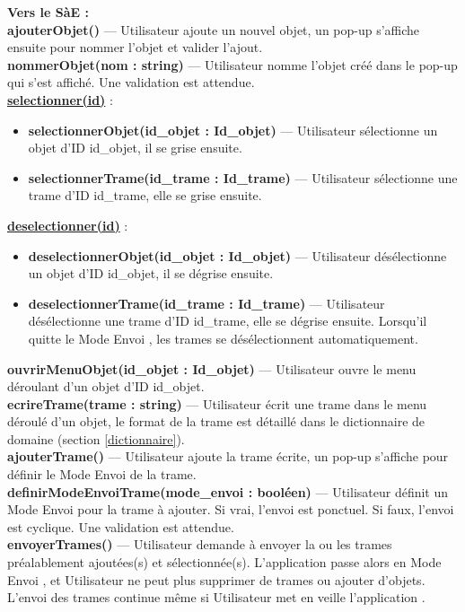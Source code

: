 \textbf{Vers le SàE :} \vspace{0.2cm}\\ %
\textbf{ajouterObjet()} --- Utilisateur ajoute un nouvel objet, un pop-up s'affiche ensuite pour nommer l'objet et valider l'ajout. \\
\textbf{nommerObjet(nom : string) } --- Utilisateur nomme l'objet créé dans le pop-up qui s'est affiché. Une validation est attendue. \\
\textbf{ \underline{selectionner(id)}} : 
\begin{itemize}
    \item \textbf{selectionnerObjet(id\_objet : Id\_objet)} --- Utilisateur sélectionne un objet d'ID id\_objet, il se grise ensuite. 
    \item \textbf{selectionnerTrame(id\_trame : Id\_trame)} --- Utilisateur sélectionne une trame d'ID id\_trame, elle se grise ensuite. 
\end{itemize}
\textbf{ \underline{deselectionner(id)}} : 
\begin{itemize}
    \item \textbf{deselectionnerObjet(id\_objet : Id\_objet)} --- Utilisateur désélectionne un objet d'ID id\_objet, il se dégrise ensuite. 
    \item \textbf{deselectionnerTrame(id\_trame : Id\_trame)} --- Utilisateur désélectionne une trame d'ID id\_trame, elle se dégrise ensuite. Lorsqu'il quitte le {\guillemotleft} Mode Envoi {\guillemotright}, les trames se désélectionnent automatiquement. 
\end{itemize}
\textbf{ouvrirMenuObjet(id\_objet : Id\_objet)} --- Utilisateur ouvre le menu déroulant d'un objet d'ID id\_objet. \\
\textbf{ecrireTrame(trame : string)} --- Utilisateur écrit une trame dans le menu déroulé d'un objet, le format de la trame est détaillé dans le dictionnaire de domaine (section \ref{dictionnaire}). \\
\textbf{ajouterTrame()} --- Utilisateur ajoute la trame écrite, un pop-up s'affiche pour définir le Mode Envoi de la trame.\\
\textbf{definirModeEnvoiTrame(mode\_envoi : booléen)} --- Utilisateur définit un Mode Envoi pour la trame à ajouter. Si vrai, l'envoi est ponctuel. Si faux, l'envoi est cyclique. Une validation est attendue. \\
\textbf{envoyerTrames()} --- Utilisateur demande à envoyer la ou les trames préalablement ajoutées(s) et sélectionnée(s). L'application {\nomApplication} passe alors en {\guillemotleft} Mode Envoi {\guillemotright}, et Utilisateur ne peut plus supprimer de trames ou ajouter d'objets. L'envoi des trames continue même si Utilisateur met en veille l'application {\nomApplication}.  \\
